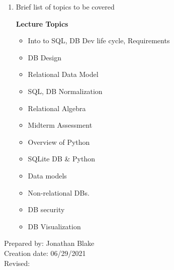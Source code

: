 \begin{enumerate}[1.]
\item Brief list of topics to be covered\\
  {\bfseries
    Lecture Topics
    \begin{itemize}
      \item Into to SQL, DB Dev life cycle, Requirements
      \item DB Design
      \item Relational Data Model
      \item SQL, DB Normalization
      \item Relational Algebra
      \item Midterm Assessment
      \item Overview of Python
      \item SQLite DB \& Python
      \item Data models
      \item Non-relational DBs.
      \item DB security
      \item DB Visualization
    \end{itemize}
  }

\end{enumerate}

\noindent Prepared by: Jonathan Blake\\
\noindent Creation date: 06/29/2021\\
\noindent Revised:\\
